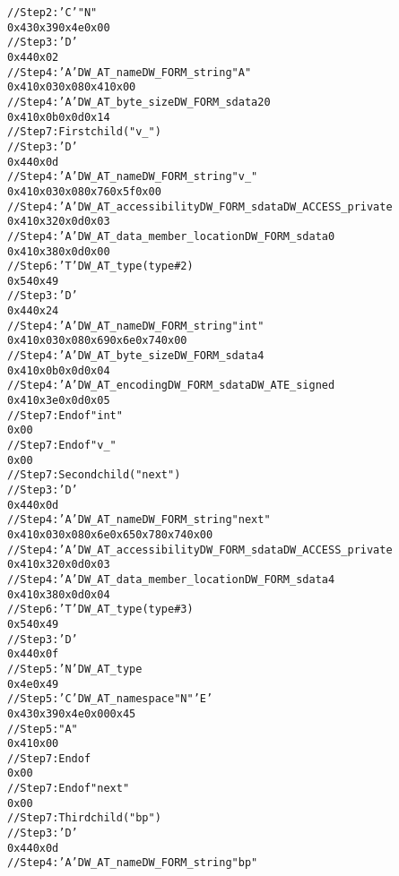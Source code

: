 \begin{alltt}
// Step 2: 'C'  "N"
0x43 0x39 0x4e 0x00
// Step 3: 'D' 
0x44 0x02
// Step 4: 'A' DW\-\_AT\-\_name DW\-\_FORM\-\_string "A"
0x41 0x03 0x08 0x41 0x00
// Step 4: 'A' DW\-\_AT\-\_byte\-\_size DW\-\_FORM\-\_sdata 20
0x41 0x0b 0x0d 0x14
// Step 7: First child ("v\_")
    // Step 3: 'D' 
    0x44 0x0d
    // Step 4: 'A' DW\-\_AT\-\_name DW\-\_FORM\-\_string "v\_"
    0x41 0x03 0x08 0x76 0x5f 0x00
    // Step 4: 'A' DW\-\_AT\-\_accessibility DW\-\_FORM\-\_sdata DW\-\_ACCESS\-\_private
    0x41 0x32 0x0d 0x03
    // Step 4: 'A' DW\-\_AT\-\_data\-\_member\-\_location DW\-\_FORM\-\_sdata 0
    0x41 0x38 0x0d 0x00
    // Step 6: 'T' DW\-\_AT\-\_type (type \#2)
    0x54 0x49
        // Step 3: 'D' 
        0x44 0x24
        // Step 4: 'A' DW\-\_AT\-\_name DW\-\_FORM\-\_string "int"
        0x41 0x03 0x08 0x69 0x6e 0x74 0x00
        // Step 4: 'A' DW\-\_AT\-\_byte\-\_size DW\-\_FORM\-\_sdata 4
        0x41 0x0b 0x0d 0x04
        // Step 4: 'A' DW\-\_AT\-\_encoding DW\-\_FORM\-\_sdata DW\-\_ATE\-\_signed
        0x41 0x3e 0x0d 0x05
        // Step 7: End of  "int"
        0x00
    // Step 7: End of  "v\_"
    0x00
// Step 7: Second child ("next")
    // Step 3: 'D' 
    0x44 0x0d
    // Step 4: 'A' DW\-\_AT\-\_name DW\-\_FORM\-\_string "next"
    0x41 0x03 0x08 0x6e 0x65 0x78 0x74 0x00
    // Step 4: 'A' DW\-\_AT\-\_accessibility DW\-\_FORM\-\_sdata DW\-\_ACCESS\-\_private
    0x41 0x32 0x0d 0x03
    // Step 4: 'A' DW\-\_AT\-\_data\-\_member\-\_location DW\-\_FORM\-\_sdata 4
    0x41 0x38 0x0d 0x04
    // Step 6: 'T' DW\-\_AT\-\_type (type \#3)
    0x54 0x49
        // Step 3: 'D' 
        0x44 0x0f
        // Step 5: 'N' DW\-\_AT\-\_type
        0x4e 0x49
        // Step 5: 'C' DW\-\_AT\-\_namespace "N" 'E'
        0x43 0x39 0x4e 0x00 0x45
        // Step 5: "A"
        0x41 0x00
        // Step 7: End of 
        0x00
    // Step 7: End of  "next"
    0x00
// Step 7: Third child ("bp")
    // Step 3: 'D' 
    0x44 0x0d
    // Step 4: 'A' DW\-\_AT\-\_name DW\-\_FORM\-\_string "bp"

\end{alltt}
